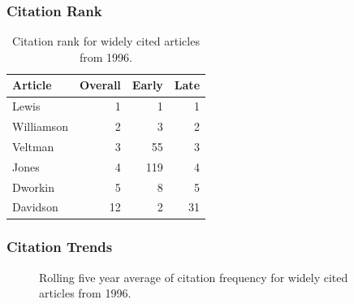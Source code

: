 \documentclass[
  10pt,
  letterpaper,
  DIV=11,
  numbers=noendperiod,
  twoside]{scrartcl}
\begin{document}
\subsubsection*{Citation Rank}\label{sec-rank-1996}

\begin{longtable}[]{@{}lrrr@{}}

\caption{\label{tbl-citation-rank-1996}Citation rank for widely cited
articles from 1996.}

\tabularnewline

\toprule\noalign{}
Article & Overall & Early & Late \\
\midrule\noalign{}
\endhead
\bottomrule\noalign{}
\endlastfoot
Lewis & 1 & 1 & 1 \\
Williamson & 2 & 3 & 2 \\
Veltman & 3 & 55 & 3 \\
Jones & 4 & 119 & 4 \\
Dworkin & 5 & 8 & 5 \\
Davidson & 12 & 2 & 31 \\

\end{longtable}

\subsubsection*{Citation Trends}\label{sec-trends-1996}

\begin{figure}


\caption{\label{fig-citation-spaghetti-1996}Rolling five year average of
citation frequency for widely cited articles from 1996.}

\end{figure}%
\end{document}
